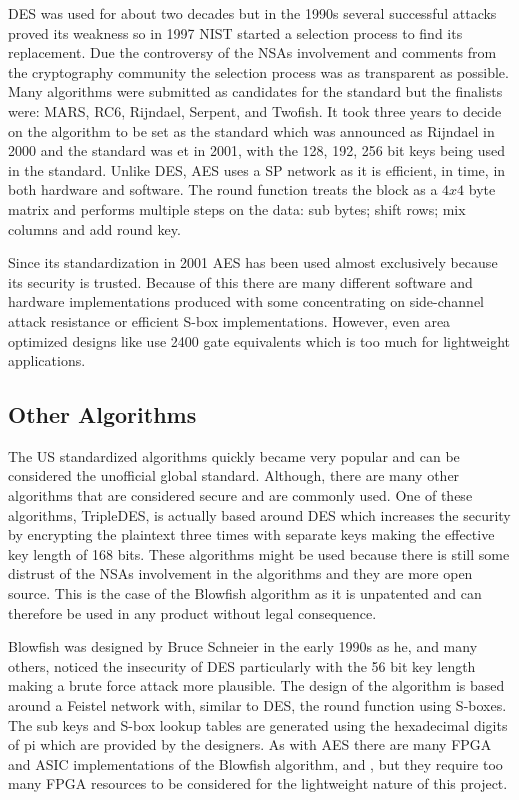 \documentclass[12pt,twoside,a4paper]{report}
\begin{document}
	DES was used for about two decades but in the 1990s several successful attacks proved its weakness\cite{Team} so in 1997 NIST started a selection process to find its replacement. Due the controversy of the NSAs involvement and comments from the cryptography community the selection process was as transparent as possible. Many algorithms were submitted as candidates for the standard but the finalists were: MARS, RC6, Rijndael, Serpent, and Twofish\cite{Flood2000}. It took three years to decide on the algorithm to be set as the standard which was announced as Rijndael in 2000 and the standard was et in 2001, with the 128, 192, 256 bit keys being used in the standard\cite{ComputerSecurityDivision2001}. Unlike DES, AES uses a SP network as it is efficient, in time, in both hardware and software. The round function treats the block as a $4x4$ byte matrix and performs multiple steps on the data: sub bytes; shift rows; mix columns and add round key.

    
	Since its standardization in 2001 AES has been used almost exclusively because its security is trusted. Because of this there are many different software and hardware implementations produced with some concentrating on side-channel attack resistance\cite{Strachacki2008} or efficient S-box implementations\cite{Gomes2016}. However, even area optimized designs like \cite{Moradi2011} use 2400 gate equivalents which is too much for lightweight applications.
    
	\subsection{Other Algorithms}
	The US standardized algorithms quickly became very popular and can be considered the unofficial global standard. Although, there are many other algorithms that are considered secure and are commonly used. One of these algorithms, TripleDES, is actually based around DES which increases the security by encrypting the plaintext three times with separate keys making the effective key length of 168 bits. These algorithms might be used because there is still some distrust of the NSAs involvement in the algorithms and they are more open source. This is the case of the Blowfish algorithm as it is unpatented and can therefore be used in any product without legal consequence.
    
	Blowfish was designed by Bruce Schneier in the early 1990s as he, and many others, noticed the insecurity of DES particularly with the 56 bit key length making a brute force attack more plausible\cite{BruceSchneier1994}. The design of the algorithm is based around a Feistel network with, similar to DES, the round function using S-boxes. The sub keys and S-box lookup tables are generated using the hexadecimal digits of pi which are provided by the designers\cite{BruceSchneier1994}. As with AES there are many FPGA and ASIC implementations of the Blowfish algorithm, \cite{Chatterjee2014} and \cite{Prasetyo2014}, but they require too many FPGA resources to be considered for the lightweight nature of this project.
    
\end{document}
